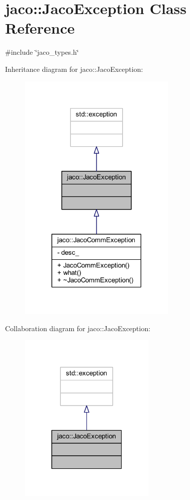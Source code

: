 \hypertarget{classjaco_1_1JacoException}{}\section{jaco\+:\+:Jaco\+Exception Class Reference}
\label{classjaco_1_1JacoException}


{\ttfamily \#include \char`\"{}jaco\+\_\+types.\+h\char`\"{}}



Inheritance diagram for jaco\+:\+:Jaco\+Exception\+:
\nopagebreak
\begin{figure}[H]
\begin{center}
\leavevmode
\includegraphics[width=213pt]{df/d89/classjaco_1_1JacoException__inherit__graph}
\end{center}
\end{figure}


Collaboration diagram for jaco\+:\+:Jaco\+Exception\+:
\nopagebreak
\begin{figure}[H]
\begin{center}
\leavevmode
\includegraphics[width=184pt]{db/d36/classjaco_1_1JacoException__coll__graph}
\end{center}
\end{figure}


